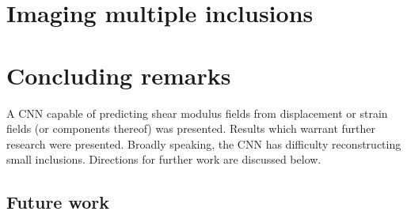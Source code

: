 \documentclass[12pt]{article}
\begin{document}
\section{Imaging multiple inclusions}
%
%
\clearpage
\section{Concluding remarks}
A CNN capable of predicting shear modulus fields from displacement or strain fields (or components thereof) was presented. Results which warrant further research were presented. Broadly speaking, the CNN has difficulty reconstructing small inclusions. Directions for further work are discussed below. 
\subsection{Future work}
\end{document}
